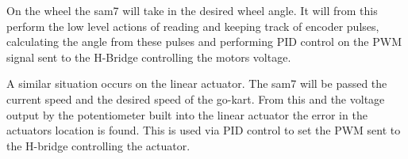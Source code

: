 On the wheel the sam7 will take in the desired wheel angle. It will from this perform the low level actions of reading and keeping track of encoder pulses, calculating the angle from these pulses and performing PID control on the PWM signal sent to the H-Bridge controlling the motors voltage.

A similar situation occurs on the linear actuator. The sam7 will be passed the current speed and the desired speed of the go-kart. From this and the voltage output by the potentiometer built into the linear actuator the error in the actuators location is found. This is used via PID control to set the PWM sent to the H-bridge controlling the actuator.
